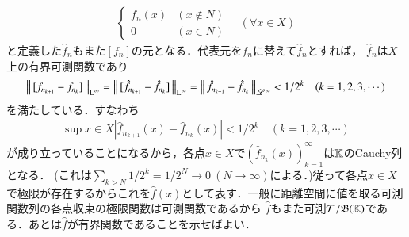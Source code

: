 \begin{prf}
\begin{description}
\begin{align}
\begin{cases}
					f_n(x) & (x \notin N) \\
					0 & (x \in N)
				\end{cases}
				\quad (\forall x \in X)
			\end{align}
			と定義した$\hat{f}_n$もまた$[f_n]$の元となる．代表元を$f_n$に替えて$\hat{f}_n$とすれば，
			$\hat{f}_n$は$X$上の有界可測関数であり
			\begin{align}
				\left\|\, [f_{n_{k+1}} - f_{n_k}]\, \right\|_{\mathrm{L}^\infty} = \left\|\, [\hat{f}_{n_{k+1}} - \hat{f}_{n_k}]\, \right\|_{\mathrm{L}^\infty}
				= \left\|\, \hat{f}_{n_{k+1}} - \hat{f}_{n_k}\, \right\|_{\mathscr{L}^\infty} < 1/2^k \quad (k=1,2,3,\cdots)
			\end{align}
			を満たしている．すなわち
			\begin{align}
				\sup{x \in X}{|\hat{f}_{n_{k+1}}(x) - \hat{f}_{n_k}(x)|} < 1/2^k \quad (k=1,2,3,\cdots)
			\end{align}
			が成り立っていることになるから，各点$x \in X$で$\left( \hat{f}_{n_k}(x) \right)_{k=1}^{\infty}$は$\mathbb{K}$のCauchy列となる．
			(これは$\sum_{k > N} 1/2^k = 1/2^N \longrightarrow 0\ (N \longrightarrow \infty)$による．)従って各点$x \in X$
			で極限が存在するからこれを$\hat{f}(x)$として表す．一般に距離空間に値を取る可測関数列の各点収束の極限関数は可測関数であるから
			$\hat{f}$もまた可測$\mathcal{F}/\mathfrak{B}(\mathbb{K})$である．あとは$\hat{f}$が有界関数であることを示せばよい．
			
	\end{description}
\end{prf}
\begin{qst}
\end{qst}